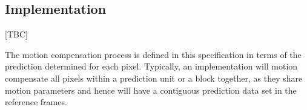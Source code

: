 \begin{informative*}
\subsection{Implementation}
\label{mcimplementation}
[TBC]

The motion compensation process is defined in this specification in
terms of the prediction determined for each pixel. Typically, an
implementation will motion compensate all pixels within a prediction
unit or a block together, as they share motion parameters and hence will
have a contiguous prediction data set in the reference frames.


%
%
%
%
%
%
%
%
%
%
%
%
%

\end{informative*}

